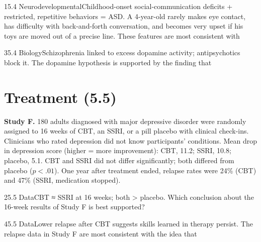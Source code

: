 \documentclass[11pt]{article}
\begin{document}
\begin{q}{1}{5.4 Neurodevelopmental}{Childhood-onset social-communication deficits + restricted, repetitive behaviors = ASD.}
A 4-year-old rarely makes eye contact, has difficulty with back-and-forth conversation, and becomes very upset if his toys are moved out of a precise line. These features are most consistent with
\end{q}

\begin{q}{3}{5.4 Biology}{Schizophrenia linked to excess dopamine activity; antipsychotics block it.}
The dopamine hypothesis is supported by the finding that
\end{q}

\section{Treatment (5.5)}

\begin{stimulus}
\textbf{Study F.} 180 adults diagnosed with major depressive disorder were randomly assigned to 16 weeks of CBT, an SSRI, or a pill placebo with clinical check-ins. Clinicians who rated depression did not know participants' conditions. Mean drop in depression score (higher = more improvement): CBT, 11.2; SSRI, 10.8; placebo, 5.1. CBT and SSRI did not differ significantly; both differed from placebo (\(p < .01\)). One year after treatment ended, relapse rates were 24\% (CBT) and 47\% (SSRI, medication stopped).
\end{stimulus}

\begin{q}{2}{5.5 Data}{CBT ≈ SSRI at 16 weeks; both > placebo.}
Which conclusion about the 16-week results of Study F is best supported?
\end{q}

\begin{q}{4}{5.5 Data}{Lower relapse after CBT suggests skills learned in therapy persist.}
The relapse data in Study F are most consistent with the idea that
\end{q}
\end{document}

